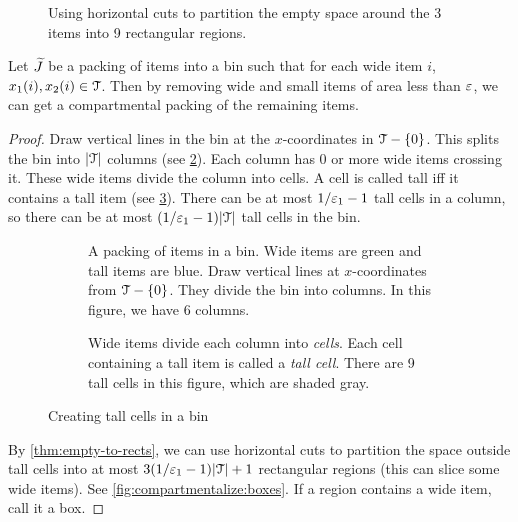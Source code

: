 \begin{figure}[htb]
\centering

\caption{Using horizontal cuts to partition the empty space
around the 3 items into 9 rectangular regions.}
\label{fig:thin-bp:empty-space-to-rects}
\end{figure}

\begin{lemma}
\label{thm:thin-bp:compartmentalize}
Let $\widetilde{J}$ be a packing of items into a bin such that for each wide item $i$,
$x_1(i), x_2(i) \in \mathcal{T}$. Then by removing wide and small items of area less than $\varepsilon$,
we can get a compartmental packing of the remaining items.
\end{lemma}
\begin{proof}
Draw vertical lines in the bin at the $x$-coordinates in $\mathcal{T} - \{0\}$.
This splits the bin into $|\mathcal{T}|$ columns (see \cref{fig:compartmentalize:begin}).
Each column has 0 or more wide items crossing it.
These wide items divide the column into cells.
A cell is called tall iff it contains a tall item (see \cref{fig:compartmentalize:tall-cells}).
There can be at most $1/\varepsilon_1-1$ tall cells in a column,
so there can be at most $(1/\varepsilon_1 - 1)|\mathcal{T}|$ tall cells in the bin.

\begin{figure}[!htb]
\begin{subfigure}{0.45\textwidth}
\centering

\caption{A packing of items in a bin. Wide items are green and tall items are blue.
Draw vertical lines at $x$-coordinates from $\mathcal{T} - \{0\}$.
They divide the bin into columns. In this figure, we have 6 columns.}
\label{fig:compartmentalize:begin}
\end{subfigure}
\hfill
\begin{subfigure}{0.45\textwidth}
\centering

\caption{Wide items divide each column into \emph{cells}.
Each cell containing a tall item is called a \emph{tall cell}.
There are 9 tall cells in this figure, which are shaded gray.}
\label{fig:compartmentalize:tall-cells}
\end{subfigure}
\caption{Creating tall cells in a bin}
\label{fig:compartmentalize-1}
\end{figure}

By \cref{thm:empty-to-rects}, we can use horizontal cuts to partition the space outside
tall cells into at most $3(1/\varepsilon_1-1)|\mathcal{T}| + 1$ rectangular regions
(this can slice some wide items). See \cref{fig:compartmentalize:boxes}.
If a region contains a wide item, call it a box.


\end{proof}
